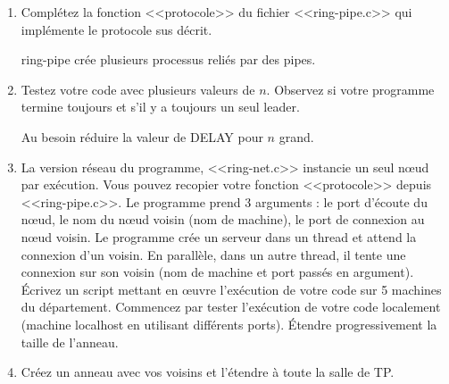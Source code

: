 \documentclass[11pt]{article}
\begin{document}
\begin{enumerate}
 \item Complétez la fonction <<protocole>> du fichier <<ring-pipe.c>> qui
implémente le protocole sus décrit. 
 \begin{solution}
 ring-pipe crée plusieurs processus reliés par des pipes.
 \end{solution}
 \item Testez votre code avec plusieurs valeurs de $n$. Observez si votre
programme termine toujours et s'il y a toujours un seul leader.
 \begin{solution}
 Au besoin réduire la valeur de DELAY pour $n$ grand.
 \end{solution}
 \item La version réseau du programme, <<ring-net.c>> instancie un seul
n\oe{}ud par exécution. Vous pouvez recopier votre fonction <<protocole>>
depuis <<ring-pipe.c>>. Le programme prend 3 arguments : le port d'écoute du
n\oe{}ud, le nom du nœud voisin (nom de machine), le port de connexion au nœud
voisin. Le programme crée un serveur dans un thread et attend la connexion d'un
voisin. En parallèle, dans un autre thread, il tente une connexion sur son
voisin (nom de machine et port passés en argument). Écrivez un script mettant
en œuvre l'exécution de votre code sur 5 machines du département. Commencez par
tester l'exécution de votre code localement (machine localhost en utilisant
différents ports). Étendre progressivement la taille de l'anneau.
 \item Créez un anneau avec vos voisins et l'étendre à toute la salle de TP.
\end{enumerate}
\end{document}
